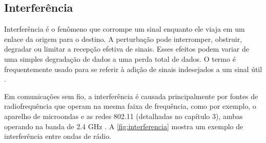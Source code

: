 \begin{figure}[H]
	\centering
\end{figure}

\subsection{Interferência}
\label{sub:interferencia}

Interferência é o fenômeno que corrompe um sinal enquanto ele viaja em um enlace da origem para o destino. A perturbação pode interromper, obstruir, degradar ou limitar a recepção efetiva de sinais. Esses efeitos podem variar de uma simples degradação de dados a uma perda total de dados. O termo é frequentemente usado para se referir à adição de sinais indesejados a um sinal útil \cite{flickenger2008}.

Em comunicações sem fio, a interferência é causada principalmente por fontes de radiofrequência que operam na mesma faixa de frequência, como por exemplo, o aparelho de microondas e as redes 802.11 (detalhadas no capítulo 3), ambas operando na banda de 2.4 GHz \cite{moraes2010}. A \autoref{fig:interferencia} mostra um exemplo de interferência entre ondas de rádio.
\begin{figure}[H]
	\centering
\end{figure}

